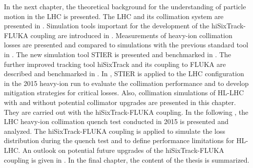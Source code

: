 In the next chapter, the theoretical background for the understanding of particle motion in the LHC is presented. The LHC and its collimation system are presented in . Simulation tools important for the development of the hiSixTrack-FLUKA coupling are introduced in . Measurements of heavy-ion collimation losses are presented and compared to simulations with the previous standard tool in . The new simulation tool STIER is presented and benchmarked in . The further improved tracking tool hiSixTrack and its coupling to FLUKA are described and benchmarked in . In , STIER is applied to the LHC configuration in the 2015 heavy-ion run to evaluate the collimation performance and to develop mitigation strategies for critical losses. Also, collimation simulations of HL-LHC with and without potential collimator upgrades are presented in this chapter. They are carried out with the hiSixTrack-FLUKA coupling. In the following , the LHC heavy-ion collimation quench test conducted in 2015 is presented and analyzed. The hiSixTrack-FLUKA coupling is applied to simulate the loss distribution during the quench test and to define performance limitations for HL-LHC. An outlook on potential future upgrades of the hiSixTrack-FLUKA coupling is given in . In the final chapter, the content of the thesis is summarized.








